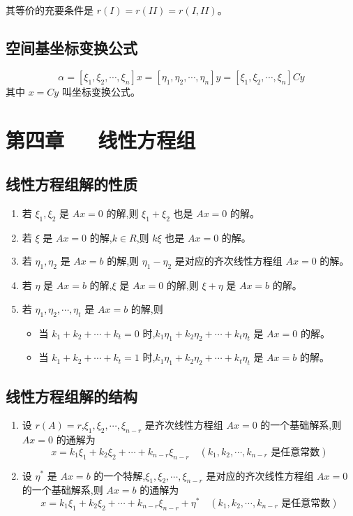 \documentclass[UTF8]{ctexart}
\theoremstyle{remark}
\begin{document}
	其等价的充要条件是 \(r(I) = r(II) = r(I,II)\)。
	
	\subsection{空间基坐标变换公式}
	\[
	\alpha = [\xi_1,\xi_2,\cdots,\xi_n]x = [\eta_1,\eta_2,\cdots,\eta_n]y = [\xi_1,\xi_2,\cdots,\xi_n]Cy
	\]
	其中 \(x = Cy\) 叫坐标变换公式。
	
	\section{第四章~~~线性方程组}
	\subsection{线性方程组解的性质}
	\begin{enumerate}
		\item 若 \(\xi_1, \xi_2\) 是 \(Ax = 0\) 的解,则 \(\xi_1 + \xi_2\) 也是 \(Ax = 0\) 的解。
		\item 若 \(\xi\) 是 \(Ax = 0\) 的解,\(k \in R\),则 \(k\xi\) 也是 \(Ax = 0\) 的解。
		\item 若 \(\eta_1, \eta_2\) 是 \(Ax = b\) 的解,则 \(\eta_1 - \eta_2\) 是对应的齐次线性方程组 \(Ax = 0\) 的解。
		\item 若 \(\eta\) 是 \(Ax = b\) 的解,\(\xi\) 是 \(Ax = 0\) 的解,则 \(\xi + \eta\) 是 \(Ax = b\) 的解。
		\item 若 \(\eta_1, \eta_2, \cdots, \eta_t\) 是 \(Ax = b\) 的解,则
		\begin{itemize}
			\item 当 \(k_1 + k_2 + \cdots + k_t = 0\) 时,\(k_1\eta_1 + k_2\eta_2 + \cdots + k_t\eta_t\) 是 \(Ax = 0\) 的解。
			\item 当 \(k_1 + k_2 + \cdots + k_t = 1\) 时,\(k_1\eta_1 + k_2\eta_2 + \cdots + k_t\eta_t\) 是 \(Ax = b\) 的解。
		\end{itemize}
	\end{enumerate}
	
	\subsection{线性方程组解的结构}
	\begin{enumerate}
		\item 设 \(r(A) = r\),\(\xi_1, \xi_2, \cdots, \xi_{n - r}\) 是齐次线性方程组 \(Ax = 0\) 的一个基础解系,则 \(Ax = 0\) 的通解为
		\[
		x = k_1\xi_1 + k_2\xi_2 + \cdots + k_{n - r}\xi_{n - r} \quad (k_1, k_2, \cdots, k_{n - r} \text{ 是任意常数})
		\]
		\item 设 \(\eta^*\) 是 \(Ax = b\) 的一个特解,\(\xi_1, \xi_2, \cdots, \xi_{n - r}\) 是对应的齐次线性方程组 \(Ax = 0\) 的一个基础解系,则 \(Ax = b\) 的通解为
		\[
		x = k_1\xi_1 + k_2\xi_2 + \cdots + k_{n - r}\xi_{n - r} + \eta^* \quad (k_1, k_2, \cdots, k_{n - r} \text{ 是任意常数})
		\]
	\end{enumerate}
	
\end{document}
